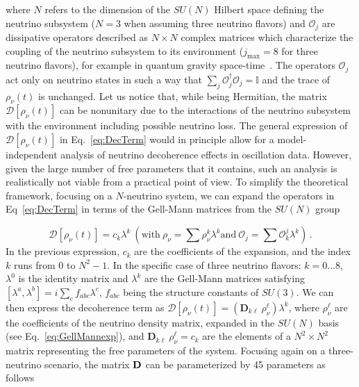 \documentclass[aps, prd, onecolumn, tightenlines, notitlepage, superscriptaddress, nofootinbib, preprintnumbers, floatfix,showkeys,11pt]{revtex4-2}
\begin{document}
where $N$ refers to the dimension of the $SU(N)$ Hilbert space defining the neutrino subsystem ($N =3$ when assuming three neutrino flavors) and $\mathcal{O}_j$ are dissipative operators described as $N \times N$ complex matrices
which characterize the coupling of the neutrino subsystem to its environment ($j_\text{max} = 8$ for three neutrino flavors), for example in quantum gravity space-time~\cite{Barenboim:2004wu,Barenboim:2006xt,Benatti:2001fa,Mavromatos:2006yn}. The operators  $\mathcal{O}_j$ act only on neutrino states in such a way that $\sum_j \mathcal{O}^\dagger_j \mathcal{O}_j = \mathbb{I}$ and the trace of $\rho_\nu(t)$ is unchanged. Let us notice that, while being Hermitian, the matrix $\mathcal{D}[\rho_\nu(t)]$ can be nonunitary due to the interactions of the neutrino subsystem with the environment including possible neutrino loss.
The general expression of $\mathcal{D}[\rho_\nu(t)]$ in Eq.~\eqref{eq:DecTerm} would in principle allow for a model-independent analysis of neutrino decoherence effects in oscillation data. However, given the large number of free parameters that it contains, such an analysis is realistically not viable from a practical point of view.
To simplify the theoretical framework, focusing on a $N$-neutrino system, we can expand the operators in Eq~\eqref{eq:DecTerm} in terms of the Gell-Mann matrices from the $SU(N)$ group~\cite{Benatti:2000ph,Gago:2002na,Carrasco:2018sca,Buoninfante:2020iyr,Stuttard:2020qfv}

\begin{equation}
\label{eq:GellMannexp}
\mathcal{D}[\rho_\nu(t)] = c_k \lambda^k ~\left(\mathrm{with}~\rho_\nu=\sum \rho_\nu^k \lambda^k \mathrm{and}~\mathcal{O}_j=\sum \mathcal{O}^j_k \lambda^k \right) \,.
\end{equation} 
%
In the previous expression, $c_k$ are the coefficients of the expansion, and the index $k$ runs from 0 to $N^2-1$. In the specific case of three neutrino flavors: $k = 0\ldots 8$, $\lambda^0$ is the identity matrix and $\lambda^k$ are the Gell-Mann matrices satisfying $[\lambda^a,\lambda^b]=i\sum_c f_{abc}\lambda^c$, $f_{abc}$ being the structure constants of $SU(3)$.
%
We can then express the decoherence term as $\mathcal{D}[\rho_\nu(t)] = (\mathbf{D}_{k \ell}~ \rho_\nu^\ell) \lambda^k$, where $\rho_\nu^\ell$ are the coefficients of the neutrino density matrix, expanded in the $SU(N)$ basis (see  Eq.~\eqref{eq:GellMannexp}), and $\mathbf{D}_{k \ell} ~\rho_\nu^\ell = c_k$ are the elements of a $N^2 \times N^2$ matrix representing the free parameters of the system.
Focusing again on a three-neutrino scenario, the matrix $\bf{D}$ can be parameterized by 45 parameters as follows
\end{document}
